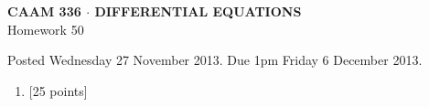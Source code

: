 \documentclass[10pt]{article}
\begin{document}
\vspace*{-5em}
\begin{center}
\large \textsf{\textbf{CAAM 336 $\cdot$ DIFFERENTIAL EQUATIONS}\\[0.5em]
Homework 50 }
\end{center}

Posted Wednesday 27 November 2013.  Due 1pm Friday 6 December 2013.

\begin{enumerate}\addtocounter{enumi}{49}
\item {[25 points]}  
\end{enumerate}
\end{document}

